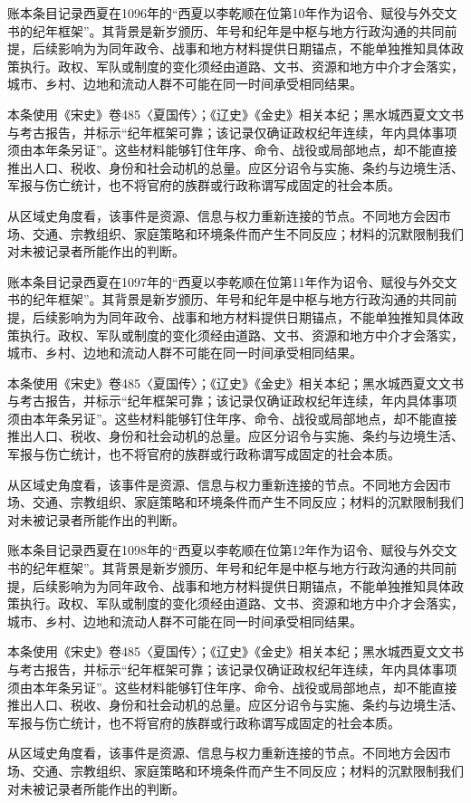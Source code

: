 账本条目记录西夏在1096年的“西夏以李乾顺在位第10年作为诏令、赋役与外交文书的纪年框架”。其背景是新岁颁历、年号和纪年是中枢与地方行政沟通的共同前提，后续影响为为同年政令、战事和地方材料提供日期锚点，不能单独推知具体政策执行。政权、军队或制度的变化须经由道路、文书、资源和地方中介才会落实，城市、乡村、边地和流动人群不可能在同一时间承受相同结果。

本条使用《宋史》卷485〈夏国传〉；《辽史》《金史》相关本纪；黑水城西夏文文书与考古报告，并标示“纪年框架可靠；该记录仅确证政权纪年连续，年内具体事项须由本年条另证”。这些材料能够钉住年序、命令、战役或局部地点，却不能直接推出人口、税收、身份和社会动机的总量。应区分诏令与实施、条约与边境生活、军报与伤亡统计，也不将官府的族群或行政称谓写成固定的社会本质。

从区域史角度看，该事件是资源、信息与权力重新连接的节点。不同地方会因市场、交通、宗教组织、家庭策略和环境条件而产生不同反应；材料的沉默限制我们对未被记录者所能作出的判断。

账本条目记录西夏在1097年的“西夏以李乾顺在位第11年作为诏令、赋役与外交文书的纪年框架”。其背景是新岁颁历、年号和纪年是中枢与地方行政沟通的共同前提，后续影响为为同年政令、战事和地方材料提供日期锚点，不能单独推知具体政策执行。政权、军队或制度的变化须经由道路、文书、资源和地方中介才会落实，城市、乡村、边地和流动人群不可能在同一时间承受相同结果。

本条使用《宋史》卷485〈夏国传〉；《辽史》《金史》相关本纪；黑水城西夏文文书与考古报告，并标示“纪年框架可靠；该记录仅确证政权纪年连续，年内具体事项须由本年条另证”。这些材料能够钉住年序、命令、战役或局部地点，却不能直接推出人口、税收、身份和社会动机的总量。应区分诏令与实施、条约与边境生活、军报与伤亡统计，也不将官府的族群或行政称谓写成固定的社会本质。

从区域史角度看，该事件是资源、信息与权力重新连接的节点。不同地方会因市场、交通、宗教组织、家庭策略和环境条件而产生不同反应；材料的沉默限制我们对未被记录者所能作出的判断。

账本条目记录西夏在1098年的“西夏以李乾顺在位第12年作为诏令、赋役与外交文书的纪年框架”。其背景是新岁颁历、年号和纪年是中枢与地方行政沟通的共同前提，后续影响为为同年政令、战事和地方材料提供日期锚点，不能单独推知具体政策执行。政权、军队或制度的变化须经由道路、文书、资源和地方中介才会落实，城市、乡村、边地和流动人群不可能在同一时间承受相同结果。

本条使用《宋史》卷485〈夏国传〉；《辽史》《金史》相关本纪；黑水城西夏文文书与考古报告，并标示“纪年框架可靠；该记录仅确证政权纪年连续，年内具体事项须由本年条另证”。这些材料能够钉住年序、命令、战役或局部地点，却不能直接推出人口、税收、身份和社会动机的总量。应区分诏令与实施、条约与边境生活、军报与伤亡统计，也不将官府的族群或行政称谓写成固定的社会本质。

从区域史角度看，该事件是资源、信息与权力重新连接的节点。不同地方会因市场、交通、宗教组织、家庭策略和环境条件而产生不同反应；材料的沉默限制我们对未被记录者所能作出的判断。
